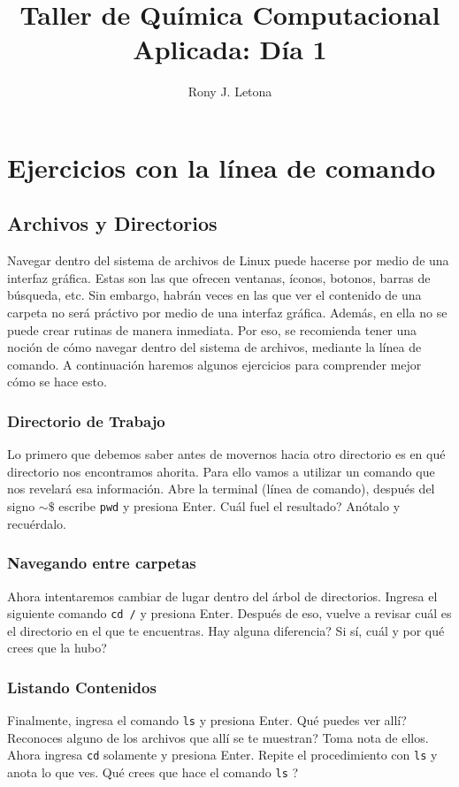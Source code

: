 \documentclass[10pt,letterpaper]{article}
\author{Rony J. Letona}
\title{Taller de Qu\'imica Computacional Aplicada: D\'ia 1}
\newcommand{\inlinecode}[1]{
\colorbox{light-gray}{\texttt{#1}}
}
\begin{document}
\maketitle

\section{Ejercicios con la l\'inea de comando}

\subsection{Archivos y Directorios}
Navegar dentro del sistema de archivos de Linux puede hacerse por medio de una interfaz gr\'afica. Estas son las que ofrecen ventanas, \'iconos, botonos, barras de b\'usqueda, etc. Sin embargo, habr\'an veces en las que ver el contenido de una carpeta no ser\'a pr\'activo por medio de una interfaz gr\'afica. Adem\'as, en ella no se puede crear rutinas de manera inmediata. Por eso, se recomienda tener una noci\'on de c\'omo navegar dentro del sistema de archivos, mediante la l\'inea de comando. A continuaci\'on haremos algunos ejercicios para comprender mejor c\'omo se hace esto.

\subsubsection{Directorio de Trabajo}
Lo primero que debemos saber antes de movernos hacia otro directorio es en qu\'e directorio nos encontramos ahorita. Para ello vamos a utilizar un comando que nos revelar\'a esa informaci\'on. Abre la terminal (l\'inea de comando), despu\'es del signo \inlinecode{$\sim\$ $} escribe \inlinecode{pwd} y presiona Enter. Cu\'al fuel el resultado? An\'otalo y recu\'erdalo.

\subsubsection{Navegando entre carpetas}
Ahora intentaremos cambiar de lugar dentro del \'arbol de directorios. Ingresa el siguiente comando \inlinecode{cd /} y presiona Enter. Despu\'es de eso, vuelve a revisar cu\'al es el directorio en el que te encuentras. Hay alguna diferencia? Si s\'i, cu\'al y por qu\'e crees que la hubo?

\subsubsection{Listando Contenidos}
Finalmente, ingresa el comando \inlinecode{ls} y presiona Enter. Qu\'e puedes ver all\'i? Reconoces alguno de los archivos que all\'i se te muestran? Toma nota de ellos. Ahora ingresa \inlinecode{cd} solamente y presiona Enter. Repite el procedimiento con \inlinecode{ls} y anota lo que ves. Qu\'e crees que hace el comando \inlinecode{ls}?
\end{document}
